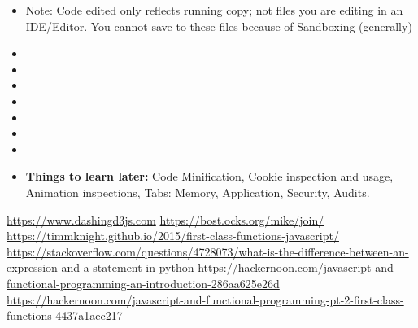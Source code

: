 \documentclass[8pt,a4paper]{extarticle}
\begin{document}
\begin{itemize}
\item Note: Code edited only reflects running copy; not files you are editing in an IDE/Editor. You cannot save to these files because of Sandboxing (generally)
\item
\item
\item 
\item
\item
\item
\item

\item \textbf{Things to learn later:} Code Minification, Cookie inspection and usage, Animation inspections, Tabs: Memory, Application, Security, Audits.
\end{itemize}


\begin{thebibliography}{9}

\url{https://www.dashingd3js.com}
\url{https://bost.ocks.org/mike/join/}
\url{https://timmknight.github.io/2015/first-class-functions-javascript/}
\url{https://stackoverflow.com/questions/4728073/what-is-the-difference-between-an-expression-and-a-statement-in-python}
\url{https://hackernoon.com/javascript-and-functional-programming-an-introduction-286aa625e26d}
\url{https://hackernoon.com/javascript-and-functional-programming-pt-2-first-class-functions-4437a1aec217}
	
\end{thebibliography}
\end{document}
